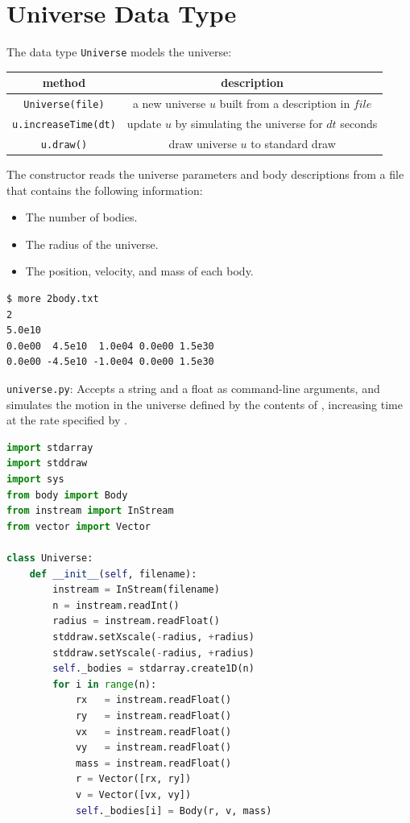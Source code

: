 \documentclass[8pt,a4paper,compress,handout]{beamer}
\begin{document}
\section{Universe Data Type}
\begin{frame}[fragile]
The data type \lstinline{Universe} models the universe:
\begin{center}
\begin{tabular}{cc}
method & description \\ \hline
\lstinline$Universe(file)$ & a new universe $u$ built from a description in $file$ \\
\lstinline$u.increaseTime(dt)$ & update $u$ by simulating the universe for $dt$ seconds \\
\lstinline$u.draw()$ & draw universe $u$ to standard draw
\end{tabular} 
\end{center}

\bigskip

The constructor reads the universe parameters and body descriptions from a file that contains the following information:
\begin{itemize}
\item The number of bodies.
\item The radius of the universe.
\item The position, velocity, and mass of each body.
\end{itemize}
\begin{lstlisting}[language={}]
$ more 2body.txt
2 
5.0e10 
0.0e00  4.5e10  1.0e04 0.0e00 1.5e30 
0.0e00 -4.5e10 -1.0e04 0.0e00 1.5e30 
\end{lstlisting}
\end{frame}

\begin{frame}[fragile]
\begin{framed}
\tiny \lstinline{universe.py}: Accepts a string  and a float  as command-line arguments, and simulates the motion in the universe defined by the contents of , increasing time at the rate specified by .
\end{framed}

\begin{lstlisting}[language=Python]
import stdarray
import stddraw
import sys
from body import Body 
from instream import InStream
from vector import Vector

class Universe:
    def __init__(self, filename):
        instream = InStream(filename)
        n = instream.readInt()
        radius = instream.readFloat()
        stddraw.setXscale(-radius, +radius)
        stddraw.setYscale(-radius, +radius)
        self._bodies = stdarray.create1D(n)
        for i in range(n):
            rx   = instream.readFloat()
            ry   = instream.readFloat()
            vx   = instream.readFloat()
            vy   = instream.readFloat()
            mass = instream.readFloat()
            r = Vector([rx, ry])
            v = Vector([vx, vy])
            self._bodies[i] = Body(r, v, mass)
\end{lstlisting}
\end{frame}
\end{document}
